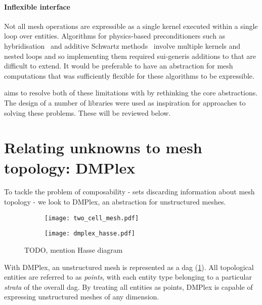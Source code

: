 \documentclass[thesis]{subfiles}
\begin{document}
\paragraph{Inflexible interface}{
  Not all mesh operations are expressible as a single kernel executed within a single loop over entities.
  Algorithms for physics-based preconditioners such as hybridisation~\cite{gibsonSlateExtendingFiredrake2020} and additive Schwartz methods~\cite{farrellPCPATCHSoftwareTopological2021} involve multiple kernels and nested loops and so implementing them required sui-generis additions to  that are difficult to extend.
  It would be preferable to have an abstraction for mesh computations that was sufficiently flexible for these algorithms to be expressible.
}

 aims to resolve both of these limitations with  by rethinking the core abstractions.
The design of a number of libraries were used as inspiration for approaches to solving these problems.
These will be reviewed below.

\section{Relating unknowns to mesh topology: DMPlex}

To tackle the problem of composability - sets discarding information about mesh topology - we look to DMPlex, an abstraction for unstructured meshes.

\begin{figure}
  \centering
  \begin{subfigure}{.49\textwidth}
    \centering
    \texttt{[image: two\_cell\_mesh.pdf]}
  \end{subfigure}
  \begin{subfigure}{.49\textwidth}
    \centering
    \texttt{[image: dmplex\_hasse.pdf]}
  \end{subfigure}
  \caption{TODO, mention Hasse diagram}
  \label{fig:dmplex_hasse}
\end{figure}

With DMPlex, an unstructured mesh is represented as a \gls{dag} (\cref{fig:dmplex_hasse}).
All topological entities are referred to as \textit{points}, with each entity type belonging to a particular \textit{strata} of the overall \gls{dag}.
By treating all entities as points, DMPlex is capable of expressing unstructured meshes of any dimension.

\end{document}
